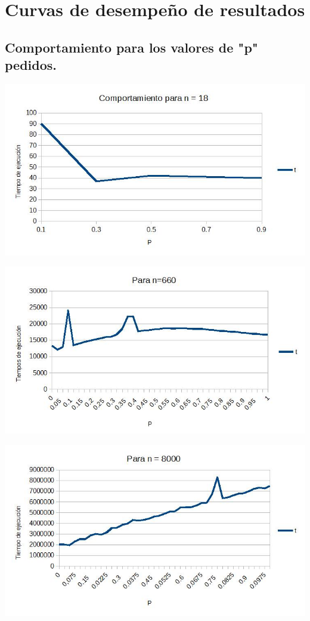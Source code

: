 \documentclass[12pt,letterpaper]{scrartcl}
\begin{document}
\newpage

\section{Curvas de desempeño de resultados}
\subsection{Comportamiento para los valores de "p" pedidos.}

\includegraphics[scale=0.55]{n}

\includegraphics[scale=0.55]{nn}

\includegraphics[scale=0.55]{nnnn}
\end{document}
